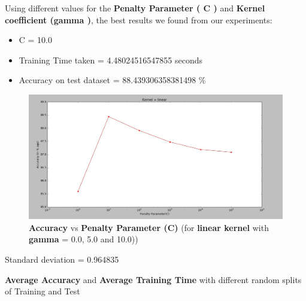 \documentclass{beamer}
\begin{document}
\begin{frame}[t, allowframebreaks]
\begin{vwcol}[widths={6.5,3.0}, sep=.8cm, justify=flush, rule=0pt, indent=1em]
\begin{minipage}{0.3\linewidth}
Using different values for the
\textbf{Penalty Parameter ( C )} and
\textbf{Kernel coefficient (gamma )},
the best results we found from
our experiments:\
\begin{itemize}
\item C = 10.0
\item Training Time taken =
4.48024516547855 seconds
\item Accuracy on test dataset =
88.439306358381498 \%
\end{itemize}

\end{minipage}
\end{vwcol}


\begin{figure}[!h]
  \includegraphics[width=0.8\linewidth]{linear.JPG}
  \caption*{\tiny \textbf{Accuracy }vs\textbf{ Penalty Parameter (C)} (for \textbf{linear kernel} with \textbf{gamma} = 0.0, 5.0 and 10.0))}
  \label{fig:}
\end{figure}
\begin{exampleblock}
\LARGE
Standard deviation = 0.964835
\end{exampleblock}
\pagebreak
\fontsize{8}{9.6}\selectfont
{\textbf{Average Accuracy} and \textbf{Average Training Time} with different random splits of Training and Test}
\linebreak

\begin{vwcol}[widths={6.5,3.0}, sep=.8cm, justify=flush, rule=0pt, indent=1em]
\begin{minipage}{0.7\linewidth}


\end{minipage}
\end{vwcol}
\end{frame}
\end{document}
